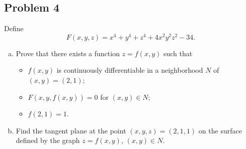 \documentclass[12pt]{article}
\theoremstyle{definition}
\begin{document}
\subsection{Problem 4}
Define 
\[
    F(x,y,z) = x^4 + y^4 + z^4 + 4x^2 y^2 z^2 - 34. 
\]
\begin{enumerate}[(a)]
    \item Prove that there exists a function $z = f(x,y)$ such that 
    \begin{itemize}
        \item $f(x,y)$ is continuously differentiable in a neighborhood $N$ of $(x,y) = (2,1)$;
        \item $F(x,y,f(x,y)) = 0$ for $(x,y) \in N$;
        \item $f(2,1) = 1$.
    \end{itemize}
    \item Find the tangent plane at the point $(x,y,z) = (2,1,1)$ on the surface defined by the graph $z = f(x,y)$, $(x,y) \in N$. 
\end{enumerate}
\end{document}
